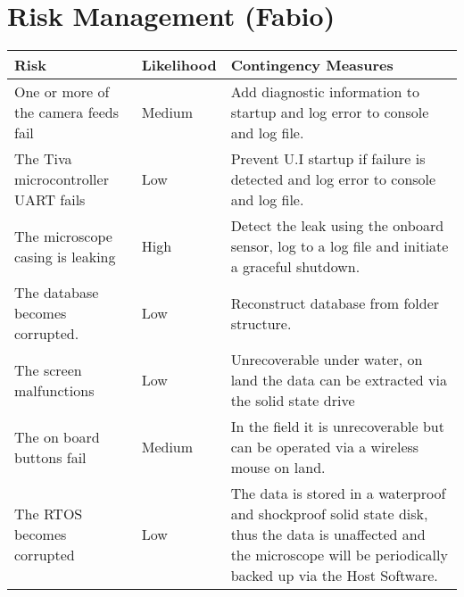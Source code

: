 \newpage
\section{Risk Management (Fabio)}
\begin{longtable}{|m{}|m{}|m{}|}
	\hline
	\textbf{Risk}                                                  & \textbf{Likelihood} & \textbf{Contingency Measures}                                                                                                                                            \\ \hline
	One or more of the camera feeds fail                           & Medium              & Add diagnostic information to startup and log error to console and log file.                                                                                             \\ \hline
	The Tiva microcontroller UART fails                            & Low                 & Prevent U.I startup if failure is detected and log error to console and log file.                                                                                        \\ \hline
	The microscope casing is leaking                               & High                & Detect the leak using the onboard sensor, log to a log file and initiate a graceful shutdown.                                                                            \\ \hline
	The database becomes corrupted.                                & Low                 & Reconstruct database from folder structure.                                                                                                                              \\ \hline
	The screen malfunctions                                        & Low                 & Unrecoverable under water, on land the data can be extracted via the solid state drive                                                                                                                                                            \\ \hline
	The on board buttons fail                                      & Medium              & In the field it is unrecoverable but can be operated via a wireless mouse on land.                                                                                       \\ \hline
	The RTOS becomes corrupted                                     & Low                 & The data is stored in a waterproof and shockproof solid state disk, thus the data is unaffected and the microscope will be periodically backed up via the Host Software. \\ \hline

\end{longtable}

